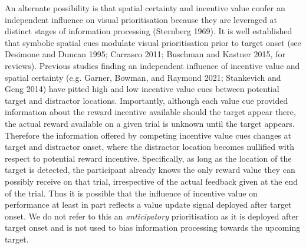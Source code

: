\documentclass[11pt,halfline,a4paper,]{ouparticle}
\begin{document}
An alternate possibility is that spatial certainty and incentive value confer an independent influence on visual prioritisation because they are leveraged at distinct stages of information processing (Sternberg 1969). It is well established that symbolic spatial cues modulate visual prioritisation prior to target onset (see Desimone and Duncan 1995; Carrasco 2011; Buschman and Kastner 2015, for reviews). Previous studies finding an independent influence of incentive value and spatial certainty (e.g. Garner, Bowman, and Raymond 2021; Stankevich and Geng 2014) have pitted high and low incentive value cues between potential target and distractor locations. Importantly, although each value cue provided information about the reward incentive available should the target appear there, the actual reward available on a given trial is unknown until the target appears. Therefore the information offered by competing incentive value cues changes at target and distractor onset, where the distractor location becomes nullified with respect to potential reward incentive. Specifically, as long as the location of the target is detected, the participant already knows the only reward value they can possibly receive on that trial, irrespective of the actual feedback given at the end of the trial. Thus it is possible that the influence of incentive value on performance at least in part reflects a value update signal deployed after target onset. We do not refer to this an \emph{anticipatory} prioritisation as it is deployed after target onset and is not used to bias information processing towards the upcoming target.
\end{document}
